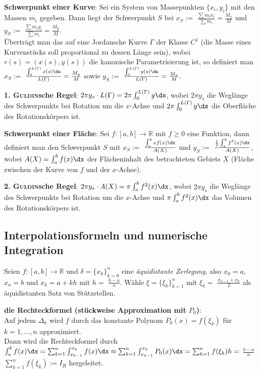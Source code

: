 \linie

\textbf{Schwerpunkt einer Kurve}:
Sei ein System von Massepunkten $\{x_i, y_i\}$ mit den Massen $m_i$ gegeben.
Dann liegt der Schwerpunkt $S$ bei
$x_S :=$ {\large $\frac{\sum m_i x_i}{\sum m_i} = \frac{M_x}{M}$} und
$y_S :=$ {\large $\frac{\sum m_i y_i}{\sum m_i} = \frac{M_y}{M}$}. \\
Überträgt man das auf eine Jordansche Kurve $\Gamma$ der Klasse $C^1$
(die Masse eines Kurvenstücks soll proportional
zu dessen Länge sein), wobei $r(s) = (x(s), y(s))$ die kanonische
Parametrisierung ist, so definiert man $x_S :=$
{\large $\frac{\int_0^{L(\Gamma)} x(s)\ds}{L(\Gamma)} = \frac{M_y}{M}$}
sowie $y_S :=$
{\large $\frac{\int_0^{L(\Gamma)} y(s)\ds}{L(\Gamma)} = \frac{M_x}{M}$}.

\textbf{1. \textsc{Guldin}sche Regel}:
$2\pi y_s \cdot L(\Gamma) = 2\pi \int_0^{L(\Gamma)} y\ds$, wobei
$2\pi y_s$ die Weglänge des Schwerpunkts bei Rotation um die $x$-Achse
und $2\pi \int_0^{L(\Gamma)} y\ds$ die Oberfläche des Rotationskörpers ist.

\linie

\textbf{Schwerpunkt einer Fläche}:
Sei $f: [a,b] \rightarrow \mathbb{R}$ mit $f \ge 0$ eine Funktion,
dann definiert man den Schwerpunkt $S$ mit
$x_S :=$ {\large $\frac{\int_a^b xf(x)\dx}{A(X)}$} und
$y_S :=$ {\large $\frac{\frac{1}{2} \int_a^b f^2(x)\dx}{A(X)}$}, wobei
$A(X) = \int_a^b f(x)\dx$ der Flächeninhalt des betrachteten Gebiets $X$
(Fläche zwischen der Kurve von $f$ und der $x$-Achse).

\textbf{2. \textsc{Guldin}sche Regel}:
$2\pi y_s \cdot A(X) = \pi \int_a^b f^2(x)\dx$, wobei
$2\pi y_s$ die Weglänge des Schwerpunkts bei Rotation um die $x$-Achse
und $\pi \int_a^b f^2(x)\dx$ das Volumen
des Rotationskörpers ist.

\subsection{%
    Interpolationsformeln und numerische Integration%
}

Seien $f: [a,b] \rightarrow \mathbb{R}$ und $\delta = \{x_k\}_{k=0}^n$
eine \emph{äquidistante Zerlegung}, also $x_0 = a$, $x_n = b$ und
$x_k = a + kh$ mit $h =$ {\large $\frac{b - a}{n}$}.
Wähle $\xi = \{\xi_k\}_{k=1}^n$ mit
$\xi_k =$ {\large $\frac{x_{k-1} + x_k}{2}$} als äquidistanten
Satz von Stützstellen.

\linie

\textbf{die Rechteckformel (stückweise Approximation mit $P_0$)}: \\
Auf jedem $\Delta_k$ wird $f$ durch das konstante Polynom
$P_0(x) = f(\xi_k)$ für $k = 1, \ldots, n$ approximiert. \\
Dann wird die Rechteckformel durch
$\int_a^b f(x)\dx = \sum_{k=1}^n \int_{x_{k-1}}^{x_k} f(x)\dx
\approx \sum_{k=1}^n \int_{x_{k-1}}^{x_k} P_0(x)\dx
= \sum_{k=1}^n f(\xi_k) h =$
{\large $\frac{b - a}{n}$} $\sum_{k=1}^n f(\xi_k) := I_R$ hergeleitet.

